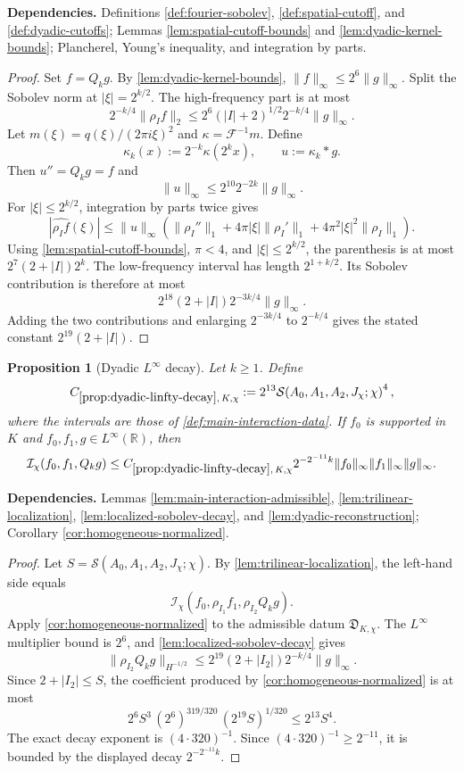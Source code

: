 \documentclass[11pt]{article}
\newtheorem{proposition}[proposition]{Proposition}
\theoremstyle{definition}
\theoremstyle{remark}
\newcommand{\R}{\mathbb R}
\newcommand{\1}{\mathbf 1}
\newcommand{\FT}[1]{\widehat{#1}}
\newcommand{\Ichi}{\mathcal I_{\chi}}
\newcommand{\hNorm}[2]{\lVert #1\rVert_{H^{#2}}}
\newcommand{\lpNorm}[2]{\lVert #1\rVert_{#2}}
\newcommand{\uses}[1]{\par\smallskip\noindent\textbf{Dependencies.} #1\par\smallskip}
\newcommand{\Ssize}[2]{\mathcal S\!\left(#1;#2\right)}
\begin{document}
\uses{Definitions \ref{def:fourier-sobolev}, \ref{def:spatial-cutoff}, and \ref{def:dyadic-cutoffs}; Lemmas \ref{lem:spatial-cutoff-bounds} and \ref{lem:dyadic-kernel-bounds}; Plancherel, Young's inequality, and integration by parts.}

\begin{proof}
Set $f=Q_kg$.  By \cref{lem:dyadic-kernel-bounds},
$\lpNorm f\infty\leq2^6\lpNorm g\infty$.
Split the Sobolev norm at $|\xi|=2^{k/2}$.  The high-frequency part is at most
\[
2^{-k/4}\lpNorm{\rho_If}2
\leq
2^6(\lvert I\rvert+2)^{1/2}2^{-k/4}\lpNorm g\infty.
\]
Let
$m(\xi)=q(\xi)/(2\pi i\xi)^2$ and
$\kappa=\mathcal F^{-1}m$.  Define
\[
\kappa_k(x):=2^{-k}\kappa(2^kx),
\qquad
u:=\kappa_k*g.
\]
Then $u''=Q_kg=f$ and
\[
\lpNorm u\infty\leq2^{10}2^{-2k}\lpNorm g\infty.
\]
For $|\xi|\leq2^{k/2}$, integration by parts twice gives
\[
|\FT{\rho_If}(\xi)|
\leq
\lpNorm u\infty
\left(
\lpNorm{\rho_I''}1
+4\pi|\xi|\lpNorm{\rho_I'}1
+4\pi^2|\xi|^2\lpNorm{\rho_I}1
\right).
\]
Using \cref{lem:spatial-cutoff-bounds}, $\pi<4$, and
$|\xi|\leq2^{k/2}$, the parenthesis is at most
$2^7(2+\lvert I\rvert)2^k$.  The low-frequency interval has length $2^{1+k/2}$.  Its Sobolev contribution is therefore at most
\[
2^{18}(2+\lvert I\rvert)2^{-3k/4}\lpNorm g\infty.
\]
Adding the two contributions and enlarging $2^{-3k/4}$ to $2^{-k/4}$ gives the stated constant $2^{19}(2+\lvert I\rvert)$.
\end{proof}

\begin{proposition}[Dyadic $L^\infty$ decay]\label{prop:dyadic-linfty-decay}
Let $k\geq1$.  Define
\[
C_{\ref{prop:dyadic-linfty-decay},\,K,\chi}
:=
2^{13}\Ssize{A_0,A_1,A_2,J_\chi}{\chi}^{4},
\]
where the intervals are those of \cref{def:main-interaction-data}.  If $f_0$ is supported in $K$ and $f_0,f_1,g\in L^\infty(\R)$, then
\[
\Ichi(f_0,f_1,Q_kg)
\leq
C_{\ref{prop:dyadic-linfty-decay},\,K,\chi}
2^{-2^{-11}k}
\lpNorm{f_0}\infty\lpNorm{f_1}\infty\lpNorm g\infty.
\]
\end{proposition}

\uses{Lemmas \ref{lem:main-interaction-admissible}, \ref{lem:trilinear-localization}, \ref{lem:localized-sobolev-decay}, and \ref{lem:dyadic-reconstruction}; Corollary \ref{cor:homogeneous-normalized}.}

\begin{proof}
Let
$S=\Ssize{A_0,A_1,A_2,J_\chi}{\chi}$.
By \cref{lem:trilinear-localization}, the left-hand side equals
\[
\Ichi(f_0,\rho_{I_1}f_1,\rho_{I_2}Q_kg).
\]
Apply \cref{cor:homogeneous-normalized} to the admissible datum
$\mathfrak D_{K,\chi}$.  The $L^\infty$ multiplier bound is $2^6$, and \cref{lem:localized-sobolev-decay} gives
\[
\hNorm{\rho_{I_2}Q_kg}{-1/2}
\leq
2^{19}(2+\lvert I_2\rvert)2^{-k/4}\lpNorm g\infty.
\]
Since $2+\lvert I_2\rvert\leq S$, the coefficient produced by \cref{cor:homogeneous-normalized} is at most
\[
2^6S^3\,(2^6)^{319/320}\,(2^{19}S)^{1/320}
\leq2^{13}S^4.
\]
The exact decay exponent is $(4\cdot320)^{-1}$.  Since
$(4\cdot320)^{-1}\geq2^{-11}$, it is bounded by the displayed decay $2^{-2^{-11}k}$.
\end{proof}
\end{document}
